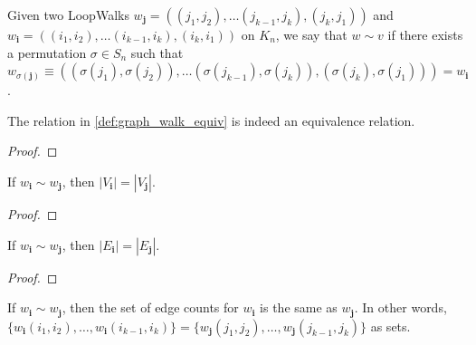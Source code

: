 \begin{definition}
  \label{def:graph_walk_equiv}
  Given two LoopWalks $w_{\mathbf{j}} = ((j_1, j_2), \dots (j_{k-1}, j_k), (j_k, j_1))$ and
  $w_{\mathbf{i}}=((i_1, i_2), \dots (i_{k-1}, i_k), (i_k, i_1))$
  on $K_n$, we say that $w \sim v$ if there exists a permutation $\sigma \in S_n$ such that
  $w_{\sigma(\mathbf{j})} \equiv ((\sigma(j_1), \sigma(j_2)),
  \dots (\sigma(j_{k-1}), \sigma(j_k)), (\sigma(j_{k}), \sigma(j_1))) = w_{\mathbf{i}}$.
\end{definition}


\begin{lemma}
  \label{lem:graph_walk_equiv}
  The relation in \ref{def:graph_walk_equiv} is indeed an equivalence relation.
\end{lemma}

\begin{proof}

\end{proof}


\begin{lemma}
  \label{lem:walk_vertex_card_equiv}
  \leanok
  If $w_{\mathbf{i}} \sim w_{\mathbf{j}}$, then $|V_{\mathbf{i}}| = |V_{\mathbf{j}}|$.
\end{lemma}

\begin{proof}

\end{proof}


\begin{lemma}
  \label{lem:walk_edge_card_equiv}
  \leanok
  If $w_{\mathbf{i}} \sim w_{\mathbf{j}}$, then $|E_{\mathbf{i}}| = |E_{\mathbf{j}}|$.
\end{lemma}

\begin{proof}

\end{proof}


\begin{lemma}
  \label{lem:walk_edge_count_equiv}
  If $w_{\mathbf{i}} \sim w_{\mathbf{j}}$, then the set of edge counts for $w_{\mathbf{i}}$ is the
  same as $w_{\mathbf{j}}$. In other words,
  $\{w_{\mathbf{i}}(i_1, i_2) , \dots, w_{\mathbf{i}}(i_{k-1}, i_k)\} =
  \{w_{\mathbf{j}}(j_1, j_2) , \dots, w_{\mathbf{j}}(j_{k-1}, j_k)\}$ as sets.
\end{lemma}


